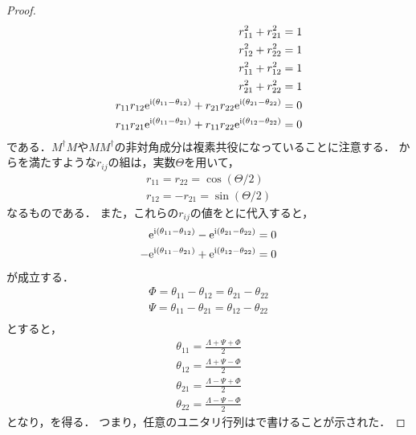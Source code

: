 \documentclass{report}
\begin{document}
\begin{proof}
\begin{align}
        r_{11}^2 + r_{21}^2 = 1 \label{r11-r21}\\ 
        r_{12}^2 + r_{22}^2 = 1 \label{r12-r22}\\ 
        r_{11}^2 + r_{12}^2 = 1 \label{r11-r12}\\ 
        r_{21}^2 + r_{22}^2 = 1 \label{r21-r22}\\ 
        r_{11}r_{12}\mathrm{e}^{\mathrm{i}(\theta_{11} - \theta_{12})} + r_{21}r_{22}\mathrm{e}^{\mathrm{i}(\theta_{21} - \theta_{22})} = 0 \label{angle-1}\\ 
        r_{11}r_{21}\mathrm{e}^{\mathrm{i}(\theta_{11} - \theta_{21})} + r_{11}r_{22}\mathrm{e}^{\mathrm{i}(\theta_{12} - \theta_{22})} = 0 \label{angle-2}
      \end{align}
      である．$M^{\dag}M$や$MM^{\dag}$の非対角成分は複素共役になっていることに注意する．
      からを満たすような$r_{ij}$の組は，実数$\Theta$を用いて，
      \begin{align}
        r_{11} = r_{22} = \cos(\Theta / 2) \\ 
        r_{12} = -r_{21} = \sin(\Theta / 2)
      \end{align}
      なるものである．
      また，これらの$r_{ij}$の値をとに代入すると，
      \begin{align}
        \mathrm{e}^{\mathrm{i}(\theta_{11} - \theta_{12})} - \mathrm{e}^{\mathrm{i}(\theta_{21} - \theta_{22})} = 0 \\ 
        -\mathrm{e}^{\mathrm{i}(\theta_{11} - \theta_{21})} + \mathrm{e}^{\mathrm{i}(\theta_{12} - \theta_{22})} = 0
      \end{align}
      が成立する．
      \begin{align}
        \Phi = \theta_{11} - \theta_{12} = \theta_{21} - \theta_{22} \\ 
        \Psi = \theta_{11} - \theta_{21} = \theta_{12} - \theta_{22} \\ 
      \end{align}
      とすると，
      \begin{align}
        \theta_{11} = \frac{\Lambda + \Psi + \Phi}{2} \\ 
        \theta_{12} = \frac{\Lambda + \Psi - \Phi}{2} \\ 
        \theta_{21} = \frac{\Lambda - \Psi + \Phi}{2} \\ 
        \theta_{22} = \frac{\Lambda - \Psi - \Phi}{2}
      \end{align}
      となり，を得る．
      つまり，任意のユニタリ行列はで書けることが示された．
    \end{proof}
\end{document}
